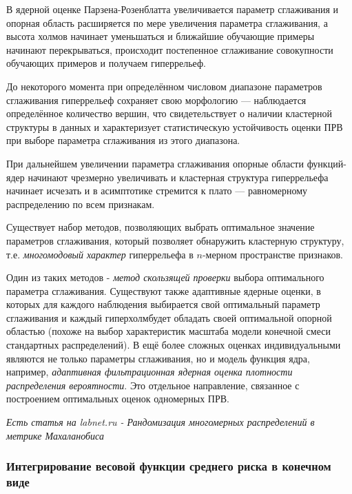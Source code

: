 \documentclass{article}
\numberwithin{equation}{subsection}
\begin{document}
В ядерной оценке Парзена-Розенблатта увеличивается параметр сглаживания и опорная область
расширяется по мере увеличения параметра сглаживания, а высота \glqq холмов\grqq
начинает уменьшаться и ближайшие обучающие примеры начинают перекрываться, происходит
постепенное сглаживание совокупности обучающих примеров и получаем \glqq гиперрельеф\grqq.

До некоторого момента при определённом числовом диапазоне параметров 
сглаживания гиперрельеф сохраняет свою морфологию --- наблюдается определённое количество
вершин, что свидетельствует о наличии кластерной структуры в данных и характеризует
статистическую устойчивость оценки ПРВ при выборе параметра сглаживания из этого диапазона.

При дальнейшем увеличении параметра сглаживания опорные области функций-ядер начинают
чрезмерно увеличивать и кластерная структура гиперрельефа начинает
исчезать и в асимптотике стремится к плато --- равномерному распределению 
по всем признакам.

Существует набор методов, позволяющих выбрать оптимальное значение параметров сглаживания,
который позволяет обнаружить кластерную структуру, т.е. \textit{многомодовый характер} 
гиперрельефа в $n$-мерном пространстве признаков.

Один из таких методов - \textit{метод скользящей проверки} выбора оптимального параметра
сглаживания. Существуют также адаптивные ядерные оценки, в которых для каждого наблюдения
выбирается свой оптимальный параметр сглаживания и каждый \glqq гиперхолм\grqq будет
обладать своей оптимальной опорной областью (похоже на выбор характеристик масштаба 
модели конечной смеси стандартных распределений).
В ещё более сложных оценках индивидуальными являются не только параметры сглаживания,
но и модель функция ядра, например, \textit{адаптивная фильтрационная ядерная оценка
плотности распределения вероятности}. Это отдельное направление, связанное с 
построением оптимальных оценок одномерных ПРВ.

\begin{myquote}
    \textit{Есть статья на labnet.ru - Рандомизация многомерных распределений в метрике
    Махаланобиса}
\end{myquote}




\subsubsection{Интегрирование весовой функции среднего риска в конечном виде}
\end{document}
